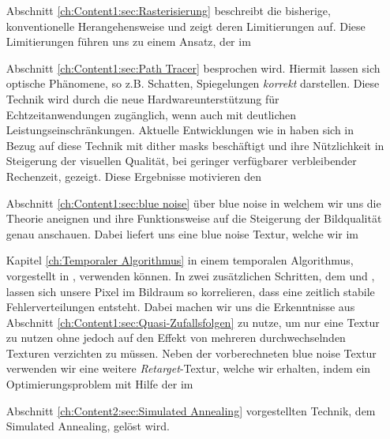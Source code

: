\begin{itemize}
    \item[Abschnitt \ref{ch:Content1:sec:Rasterisierung}] beschreibt die bisherige, konventionelle Herangehensweise und zeigt deren Limitierungen auf. Diese 
        Limitierungen führen uns zu einem Ansatz, der im 

    \item[Abschnitt \ref{ch:Content1:sec:Path Tracer}] besprochen wird. Hiermit lassen sich optische Phänomene, so z.B. Schatten, Spiegelungen \textit{korrekt} darstellen.
        Diese Technik wird durch die neue Hardwareunterstützung für Echtzeitanwendungen zugänglich, wenn auch mit deutlichen Leistungseinschränkungen.
        Aktuelle Entwicklungen wie in \cite{georgiev2016blue} haben sich in Bezug auf diese Technik mit  dither masks beschäftigt
        und ihre Nützlichkeit in Steigerung der visuellen Qualität, bei geringer verfügbarer verbleibender Rechenzeit, gezeigt. Diese Ergebnisse motivieren den

    \item[Abschnitt \ref{ch:Content1:sec:blue noise}] über blue noise in welchem wir uns die Theorie aneignen und ihre Funktionsweise auf die Steigerung der 
        Bildqualität genau anschauen. Dabei liefert uns \cite{bluenoisechrisschied} eine blue noise Textur, welche wir im

    \item[Kapitel \ref{ch:Temporaler Algorithmus}]in einem temporalen Algorithmus, vorgestellt in \cite{hal02158423}, verwenden können. In zwei zusätzlichen Schritten, dem 
     und , lassen sich unsere Pixel im Bildraum so korrelieren, dass eine zeitlich stabile Fehlerverteilungen
    entsteht. Dabei machen wir uns die Erkenntnisse aus Abschnitt \ref{ch:Content1:sec:Quasi-Zufallsfolgen} zu nutze, um nur eine Textur zu nutzen ohne jedoch auf den Effekt von mehreren 
    durchwechselnden Texturen verzichten zu müssen. Neben der vorberechneten blue noise Textur verwenden wir eine weitere \textit{Retarget}-Textur, welche wir erhalten, indem ein Optimierungsproblem 
    mit Hilfe der im  

    \item[Abschnitt \ref{ch:Content2:sec:Simulated Annealing}]vorgestellten Technik, dem Simulated Annealing, gelöst wird.   

\end{itemize}
 


